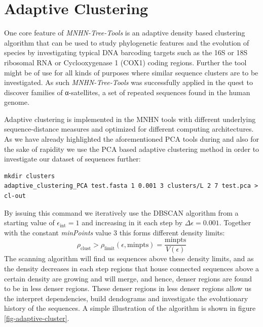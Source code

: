 \section{Adaptive Clustering}

One core feature of \emph{MNHN-Tree-Tools} is an adaptive density
based clustering algorithm that can be used to study phylogenetic
features and the evolution of species by investigating typical
DNA barcoding targets such as the 16S or 18S ribosomal RNA or
Cyclooxygenase 1 (COX1) coding regions. Further the tool might be of
use for all kinds of purposes where similar sequence clusters are to
be investigated. As such \emph{MNHN-Tree-Tools}
was successfully applied in the quest to discover families of
α-satellites, a set of repeated sequences found in the human genome.

Adaptive clustering is implemented in the MNHN tools with different underlying
sequence-distance measures and optimized for different computing
architectures. As we have already highlighted the aforementioned
PCA tools during and also for the sake of rapidity we use the PCA
based adaptive clustering method in order to
investigate our dataset of sequences further:
\begin{lstlisting}
mkdir clusters
adaptive_clustering_PCA test.fasta 1 0.001 3 clusters/L 2 7 test.pca > cl-out
\end{lstlisting}
By issuing this command we iteratively use the DBSCAN algorithm
\cite{dbscan} from a 
starting value of $\epsilon_{\mathrm{int}} = 1$ and increasing in it
each step by $\Delta\epsilon = 0.001$. Together with the constant
\emph{minPoints} value 3 this forms different density limits:
\begin{equation}
  \rho_{\mathrm{clust}} >
  \rho_{\mathrm{limit}}(\epsilon,\mathrm{minpts}) =
  \frac{\mathrm{minpts}}{V(\epsilon)}
\end{equation}
The scanning algorithm will find us sequences above these density limits,
and as the density decreases in each step regions that house connected
sequences above a certain density are growing and will merge, and
hence, denser regions are found to be in less denser regions. These
denser regions in less denser regions allow us the interpret
dependencies, build dendograms and investigate the evolutionary
history of the sequences. A simple
illustration of the algorithm is shown in figure
\ref{fig-adaptive-cluster}.
